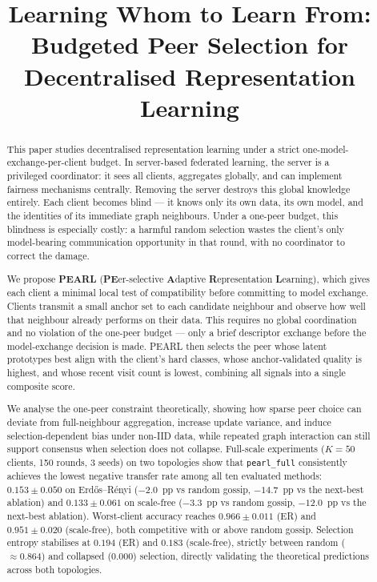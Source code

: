 \documentclass[conference]{IEEEtran}
\begin{document}
\title{Learning Whom to Learn From: Budgeted Peer Selection for Decentralised Representation Learning}

\author{
}

\maketitle

\begin{abstract}
This paper studies decentralised representation learning under a strict one-model-exchange-per-client budget. In server-based federated learning, the server is a privileged coordinator: it sees all clients, aggregates globally, and can implement fairness mechanisms centrally. Removing the server destroys this global knowledge entirely. Each client becomes blind --- it knows only its own data, its own model, and the identities of its immediate graph neighbours. Under a one-peer budget, this blindness is especially costly: a harmful random selection wastes the client's only model-bearing communication opportunity in that round, with no coordinator to correct the damage.

We propose \textbf{PEARL} (\textbf{PE}er-selective \textbf{A}daptive \textbf{R}epresentation \textbf{L}earning), which gives each client a minimal local test of compatibility before committing to model exchange. Clients transmit a small anchor set to each candidate neighbour and observe how well that neighbour already performs on their data. This requires no global coordination and no violation of the one-peer budget --- only a brief descriptor exchange before the model-exchange decision is made. PEARL then selects the peer whose latent prototypes best align with the client's hard classes, whose anchor-validated quality is highest, and whose recent visit count is lowest, combining all signals into a single composite score.

We analyse the one-peer constraint theoretically, showing how sparse peer choice can deviate from full-neighbour aggregation, increase update variance, and induce selection-dependent bias under non-IID data, while repeated graph interaction can still support consensus when selection does not collapse. Full-scale experiments ($K=50$ clients, 150 rounds, 3 seeds) on two topologies show that \texttt{pearl\_full} consistently achieves the lowest negative transfer rate among all ten evaluated methods: $0.153\pm0.050$ on Erd\H{o}s--R\'{e}nyi ($-2.0$~pp vs random gossip, $-14.7$~pp vs the next-best ablation) and $0.133\pm0.061$ on scale-free ($-3.3$~pp vs random gossip, $-12.0$~pp vs the next-best ablation). Worst-client accuracy reaches $0.966\pm0.011$ (ER) and $0.951\pm0.020$ (scale-free), both competitive with or above random gossip. Selection entropy stabilises at $0.194$ (ER) and $0.183$ (scale-free), strictly between random ($\approx0.864$) and collapsed ($0.000$) selection, directly validating the theoretical predictions across both topologies.
\end{abstract}
\end{document}
